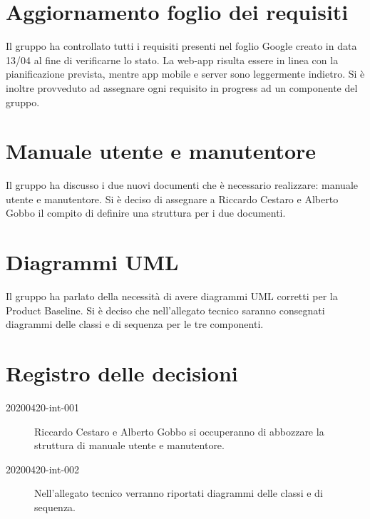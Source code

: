 \documentclass{article}
\begin{document}
\section{Aggiornamento foglio dei requisiti}%
\label{sec:aggiornamento_foglio_dei_requisiti}

Il gruppo ha controllato tutti i requisiti presenti nel foglio Google creato in data 13/04 al fine di verificarne lo stato.
La web-app risulta essere in linea con la pianificazione prevista, mentre app mobile e server sono leggermente indietro.
Si è inoltre provveduto ad assegnare ogni requisito in progress ad un componente del gruppo.

\section{Manuale utente e manutentore}%
\label{sec:manuale_utente_e_manutentore}

Il gruppo ha discusso i due nuovi documenti che è necessario realizzare: manuale utente e manutentore.
Si è deciso di assegnare a Riccardo Cestaro e Alberto Gobbo il compito di definire una struttura per i due documenti.

\section{Diagrammi UML}%
\label{sec:diagrammi_uml}

Il gruppo ha parlato della necessità di avere diagrammi UML corretti per la Product Baseline.
Si è deciso che nell'allegato tecnico saranno consegnati diagrammi delle classi e di sequenza per le tre componenti.

\newpage
\section{Registro delle decisioni}%
\label{sec:registro_delle_decisioni}

\begin{description}
  \item [20200420-int-001] Riccardo Cestaro e Alberto Gobbo si occuperanno di abbozzare la struttura di manuale utente e manutentore.
  \item [20200420-int-002] Nell'allegato tecnico verranno riportati diagrammi delle classi e di sequenza.
\end{description}
\end{document}
